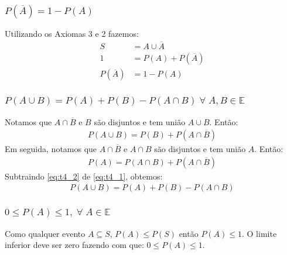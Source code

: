 \documentclass{article}
\newcommand\ov[1]{\overline{#1}}
\begin{document}
\subsubsection{$P(\ov{A}) = 1 - P(A)$}
Utilizando os Axiomas 3 e 2 fazemos:
\begin{align*}
	S         & = A \cup \ov{A}    \\
	1         & = P(A) + P(\ov{A}) \\
	P(\ov{A}) & = 1 - P(A)
\end{align*}

\subsubsection{$P(A \cup B) = P(A) + P(B) - P(A \cap B) \; \forall \; A,B \in \mathbb{E}$}
Notamos que $A \cap \ov{B}$ e $B$ são disjuntos e tem união $A \cup B$. Então:
\begin{align}
	P(A \cup B) = P(B) + P(A \cap \ov{B}) \label{eq:t4_1}
\end{align}
Em seguida, notamos que $A \cap \ov{B}$ e $A \cap B$ são disjuntos e tem união $A$. Então:
\begin{align}
	P(A) = P(A \cap B) + P(A \cap \ov{B}) \label{eq:t4_2}
\end{align}
Subtraindo \ref{eq:t4_2} de \ref{eq:t4_1}, obtemos:
\begin{align*}
	P(A \cup B) = P(A) + P(B) - P(A \cap B)
\end{align*}

\subsubsection{$0 \leq P(A) \leq 1, \; \forall \; A \in \mathbb{E}$}
Como qualquer evento $A \subseteq S$, $P(A) \leq P(S)$ então $P(A) \leq 1$. O limite inferior deve
ser zero fazendo com que: $0 \leq P(A) \leq 1$.
\end{document}
